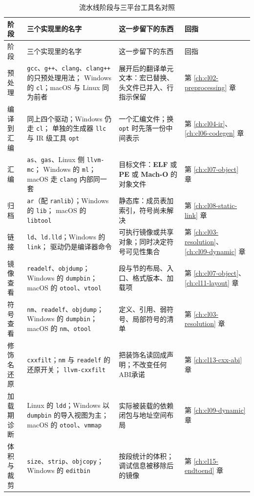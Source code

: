 \documentclass[12pt,a4paper,fontset=fandol]{ctexbook}
\newcommand{\Tool}[1]{\texttt{#1}}
\newcommand{\Elf}{\textbf{\textsf{ELF}}}
\newcommand{\PeFmt}{\textbf{\textsf{PE}}}
\newcommand{\Macho}{\textbf{\textsf{Mach-O}}}
\newcommand{\Nix}{\textsf{Linux}}
\newcommand{\Win}{\textsf{Windows}}
\newcommand{\Mac}{\textsf{macOS}}
\begin{document}
\begin{longtable}{@{}>{\raggedright\arraybackslash}p{} >{\raggedright\arraybackslash}p{} >{\raggedright\arraybackslash}p{} >{\raggedright\arraybackslash}p{}@{}}
\caption{流水线阶段与三平台工具名对照}\label{tab:apA-stages}\\
\toprule
阶段 & 三个实现里的名字 & 这一步留下的东西 & 回指 \\
\midrule
\endfirsthead
\toprule
阶段 & 三个实现里的名字 & 这一步留下的东西 & 回指 \\
\midrule
\endhead
\bottomrule
\endfoot
预处理 & \Tool{gcc}、\Tool{g++}、\Tool{clang}、\Tool{clang++} 的只预处理用法；
\Win{} 的 \Tool{cl}；\Mac{} 与 \Nix{} 同为前者 &
展开后的翻译单元文本：宏已替换、头文件已并入、行指示保留 &
第 \ref{ch:cl02-preprocessing} 章 \\
编译到汇编 & 同上四个驱动；\Win{} 仍走 \Tool{cl}；
单独的生成器 \Tool{llc} 与 IR 级工具 \Tool{opt} &
一个汇编文件；换 \Tool{opt} 时先落一份中间表示 &
第 \ref{ch:cl04-ir}、\ref{ch:cl06-codegen} 章 \\
汇编 & \Tool{as}、\Tool{gas}、\Nix{} 侧 \Tool{llvm-mc}；
\Win{} 的 \Tool{ml}；\Mac{} 走 \Tool{clang} 内部同一套 &
目标文件：\Elf{} 或 \PeFmt{} 或 \Macho{} 的对象文件 &
第 \ref{ch:cl07-object} 章 \\
归档 & \Tool{ar}（配 \Tool{ranlib}）；\Win{} 的 \Tool{lib}；
\Mac{} 的 \Tool{libtool} &
静态库：成员表加索引，符号尚未解决 &
第 \ref{ch:cl08-static-link} 章 \\
链接 & \Tool{ld}、\Tool{ld.lld}；\Win{} 的 \Tool{link}；
驱动仍是编译器命令 &
可执行镜像或共享对象；同时决定符号可见性集合 &
第 \ref{ch:cl03-resolution}、\ref{ch:cl09-dynamic} 章 \\
镜像查看 & \Tool{readelf}、\Tool{objdump}；\Win{} 的 \Tool{dumpbin}；
\Mac{} 的 \Tool{otool}、\Tool{vtool} &
段与节的布局、入口、格式版本、加载项 &
第 \ref{ch:cl07-object}、\ref{ch:cl11-layout} 章 \\
符号查看 & \Tool{nm}、\Tool{readelf}、\Tool{objdump}；\Win{} 的 \Tool{dumpbin}；
\Mac{} 的 \Tool{nm}、\Tool{otool} &
定义、引用、弱符号、局部符号的清单 &
第 \ref{ch:cl03-resolution} 章 \\
修饰名还原 & \Tool{cxxfilt}；\Tool{nm} 与 \Tool{readelf} 的还原开关；
\Tool{llvm-cxxfilt} &
把装饰名读回成声明；不改变任何ABI承诺 &
第 \ref{ch:cl13-cxx-abi} 章 \\
加载期诊断 & \Nix{} 的 \Tool{ldd}；\Win{} 以 \Tool{dumpbin}{} 的导入视图为主；
\Mac{} 的 \Tool{otool}、\Tool{vmmap} &
实际被装载的依赖闭包与地址空间布局 &
第 \ref{ch:cl09-dynamic} 章 \\
体积与裁剪 & \Tool{size}、\Tool{strip}、\Tool{objcopy}；\Win{} 的 \Tool{editbin} &
按段统计的体积；调试信息被移除后的镜像 &
第 \ref{ch:cl15-endtoend} 章 \\
\end{longtable}
\end{document}
